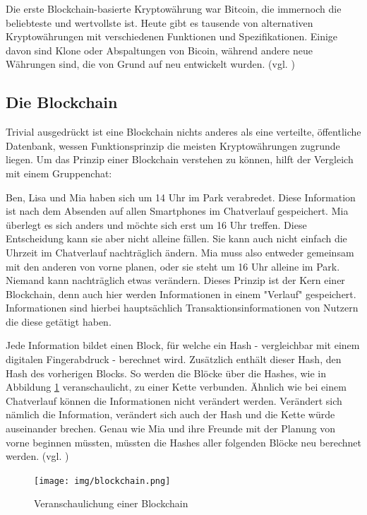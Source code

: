 \documentclass[oneside]{ausarbeitung}
\begin{document}
Die erste Blockchain-basierte Kryptowährung war Bitcoin, die
immernoch die beliebteste und wertvollste ist. Heute gibt es tausende
von alternativen Kryptowährungen mit verschiedenen Funktionen und
Spezifikationen. Einige davon sind Klone oder Abspaltungen von Bicoin,
während andere neue Währungen sind, die von Grund auf neu entwickelt
wurden. (vgl. \cite{cryptocurrency_explained})

\subsection{Die Blockchain}
\label{sub:blockchain}

Trivial ausgedrückt ist eine Blockchain nichts anderes als eine
verteilte, öffentliche Datenbank\cite{blockchain_definition}, wessen
Funktionsprinzip die meisten Kryptowährungen zugrunde
liegen\cite{blockchain_1}.
Um das Prinzip einer Blockchain verstehen zu können, hilft der
Vergleich mit einem Gruppenchat:

Ben, Lisa und Mia haben sich um 14 Uhr im Park verabredet. Diese
Information ist nach dem Absenden auf allen Smartphones im Chatverlauf
gespeichert. Mia überlegt es sich anders und möchte sich erst um 16
Uhr treffen. Diese Entscheidung kann sie aber nicht alleine fällen.
Sie kann auch nicht einfach die Uhrzeit im Chatverlauf nachträglich
ändern. Mia muss also entweder gemeinsam mit den anderen von vorne
planen, oder sie steht um 16 Uhr alleine im Park. Niemand kann
nachträglich etwas verändern. Dieses Prinzip ist der Kern einer
Blockchain, denn auch hier werden Informationen in einem "Verlauf"
gespeichert. Informationen sind hierbei hauptsächlich
Transaktionsinformationen von Nutzern die diese getätigt haben.

Jede Information bildet einen Block, für welche ein Hash -
vergleichbar mit einem digitalen Fingerabdruck - berechnet wird.
Zusätzlich enthält dieser Hash, den Hash des vorherigen Blocks. So
werden die Blöcke über die Hashes, wie in Abbildung \ref{fig:4}
veranschaulicht, zu einer Kette verbunden. Ähnlich wie bei einem
Chatverlauf können die Informationen nicht verändert werden.
Verändert sich nämlich die Information, verändert sich auch der
Hash und die Kette würde auseinander brechen. Genau wie Mia und ihre
Freunde mit der Planung von vorne beginnen müssten, müssten die
Hashes aller folgenden Blöcke neu berechnet werden. (vgl.
\cite{blockchain})

\begin{figure}[H]
  \centering
  \texttt{[image: img/blockchain.png]}
  \caption{Veranschaulichung einer Blockchain\cite{blockchain}}
  \label{fig:4}
\end{figure} 
\end{document}
